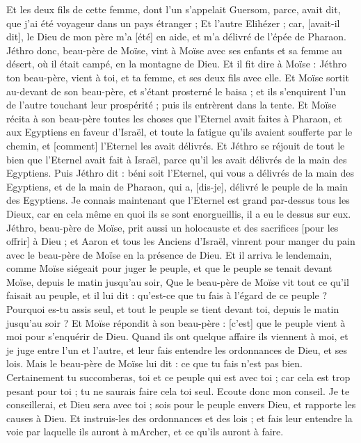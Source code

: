 \begin{multicols}{2}
Et les deux fils de cette femme, dont l'un s'appelait Guersom, parce, avait dit, que j'ai été voyageur dans un pays étranger ;
Et l'autre Elihézer ; car, [avait-il dit], le Dieu de mon père m'a [été] en aide, et m'a délivré de l'épée de Pharaon.
Jéthro donc, beau-père de Moïse, vint à Moïse avec ses enfants et sa femme au désert, où il était campé, en la montagne de Dieu.
Et il fit dire à Moïse : Jéthro ton beau-père, vient à toi, et ta femme, et ses deux fils avec elle.
Et Moïse sortit au-devant de son beau-père, et s'étant prosterné le baisa ; et ils s'enquirent l'un de l'autre touchant leur prospérité ; puis ils entrèrent dans la tente.
Et Moïse récita à son beau-père toutes les choses que l'Eternel avait faites à Pharaon, et aux Egyptiens en faveur d'Israël, et toute la fatigue qu'ils avaient soufferte par le chemin, et [comment] l'Eternel les avait délivrés.
Et Jéthro se réjouit de tout le bien que l'Eternel avait fait à Israël, parce qu'il les avait délivrés de la main des Egyptiens.
Puis Jéthro dit : béni soit l'Eternel, qui vous a délivrés de la main des Egyptiens, et de la main de Pharaon, qui a, [dis-je], délivré le peuple de la main des Egyptiens.
Je connais maintenant que l'Eternel est grand par-dessus tous les Dieux, car en cela même en quoi ils se sont enorgueillis, il a eu le dessus sur eux.
Jéthro, beau-père de Moïse, prit aussi un holocauste et des sacrifices [pour les offrir] à Dieu ; et Aaron et tous les Anciens d'Israël, vinrent pour manger du pain avec le beau-père de Moïse en la présence de Dieu.
Et il arriva le lendemain, comme Moïse siégeait pour juger le peuple, et que le peuple se tenait devant Moïse, depuis le matin jusqu'au soir,
Que le beau-père de Moïse vit tout ce qu'il faisait au peuple, et il lui dit : qu'est-ce que tu fais à l'égard de ce peuple ? Pourquoi es-tu assis seul, et tout le peuple se tient devant toi, depuis le matin jusqu'au soir ?
Et Moïse répondit à son beau-père : [c'est] que le peuple vient à moi pour s'enquérir de Dieu.
Quand ils ont quelque affaire ils viennent à moi, et je juge entre l'un et l'autre, et leur fais entendre les ordonnances de Dieu, et ses lois.
Mais le beau-père de Moïse lui dit : ce que tu fais n'est pas bien.
Certainement tu succomberas, toi et ce peuple qui est avec toi ; car cela est trop pesant pour toi ; tu ne saurais faire cela toi seul.
Ecoute donc mon conseil. Je te conseillerai, et Dieu sera avec toi ; sois pour le peuple envers Dieu, et rapporte les causes à Dieu.
Et instruis-les des ordonnances et des lois ; et fais leur entendre la voie par laquelle ils auront à mArcher, et ce qu'ils auront à faire.

\end{multicols}
